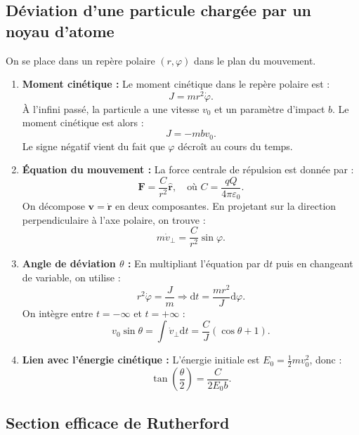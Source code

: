 \documentclass[a4paper,10pt]{report}
\begin{document}
	
	\subsection{Déviation d’une particule chargée par un noyau d’atome}
	
	On se place dans un repère polaire $(r,\varphi)$ dans le plan du mouvement.
	\begin{enumerate}
		\item \textbf{Moment cinétique :} Le moment cinétique dans le repère polaire est :
		\[
		J = m r^2 \dot{\varphi}.
		\]
		À l'infini passé, la particule a une vitesse $v_0$ et un paramètre d'impact $b$. Le moment cinétique est alors :
		\[
		J = -m b v_0.
		\]
		Le signe négatif vient du fait que $\varphi$ décroît au cours du temps.
		
		\item \textbf{Équation du mouvement :} La force centrale de répulsion est donnée par :
		\[
		\textbf{F} = \frac{C}{r^2} \hat{\textbf{r}}, \quad \text{où } C = \frac{qQ}{4\pi\varepsilon_0}.
		\]
		On décompose $\textbf{v} = \dot{\textbf{r}}$ en deux composantes. En projetant sur la direction perpendiculaire à l’axe polaire, on trouve :
		\[
		m \dot{v}_\perp = \frac{C}{r^2} \sin\varphi.
		\]
		
		\item \textbf{Angle de déviation $\theta$ :} En multipliant l’équation par $\mathrm{d}t$ puis en changeant de variable, on utilise :
		\[
		r^2 \dot{\varphi} = \frac{J}{m} \Rightarrow \mathrm{d}t = \frac{m r^2}{J} \mathrm{d}\varphi.
		\]
		On intègre entre $t = -\infty$ et $t = +\infty$ :
		\[
		v_0 \sin\theta = \int \dot{v}_\perp \mathrm{d}t = \frac{C}{J} (\cos\theta + 1).
		\]
		
		\item \textbf{Lien avec l’énergie cinétique :} L’énergie initiale est $E_0 = \frac{1}{2} m v_0^2$, donc :
		\[
		\tan\left(\frac{\theta}{2}\right) = \frac{C}{2 E_0 b}.
		\]
	\end{enumerate}
	
	\subsection{Section efficace de Rutherford}
	
\end{document}
